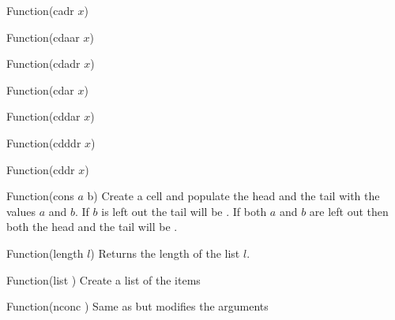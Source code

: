 \begin{defun}{Function}{(cadr $x$)}
\end{defun}

\begin{defun}{Function}{(cdaar $x$)}
\end{defun}

\begin{defun}{Function}{(cdadr $x$)}
\end{defun}

\begin{defun}{Function}{(cdar $x$)}
\end{defun}

\begin{defun}{Function}{(cddar $x$)}
\end{defun}

\begin{defun}{Function}{(cdddr $x$)}
\end{defun}

\begin{defun}{Function}{(cddr $x$)}
\end{defun}

\begin{defun}{Function}{(cons $a$ b)}
  Create a  cell and populate the head and the tail with
  the values $a$ and $b$. If $b$ is left out the tail will be \NIL. If
  both $a$ and $b$ are left out then both the head and the tail will
  be \NIL.

  \begin{examples}
  \end{examples}
\end{defun}

\begin{defun}{Function}{(length $l$)}
  Returns the length of the list $l$.
\end{defun}

\begin{defun}{Function}{(list \xargs)}
  Create a list of the items \largs
\end{defun}

\begin{defun}{Function}{(nconc \xargs)}
  Same as  but modifies the arguments \largs
\end{defun}

